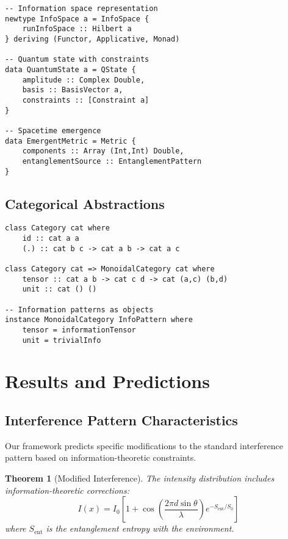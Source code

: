 \documentclass[12pt,a4paper]{article}
\newtheorem{theorem}{Theorem}[section]
\begin{document}
\begin{lstlisting}[style=haskell]
-- Information space representation
newtype InfoSpace a = InfoSpace { 
    runInfoSpace :: Hilbert a 
} deriving (Functor, Applicative, Monad)

-- Quantum state with constraints
data QuantumState a = QState {
    amplitude :: Complex Double,
    basis :: BasisVector a,
    constraints :: [Constraint a]
}

-- Spacetime emergence
data EmergentMetric = Metric {
    components :: Array (Int,Int) Double,
    entanglementSource :: EntanglementPattern
}
\end{lstlisting}

\subsection{Categorical Abstractions}

\begin{lstlisting}[style=haskell]
class Category cat where
    id :: cat a a
    (.) :: cat b c -> cat a b -> cat a c

class Category cat => MonoidalCategory cat where
    tensor :: cat a b -> cat c d -> cat (a,c) (b,d)
    unit :: cat () ()

-- Information patterns as objects
instance MonoidalCategory InfoPattern where
    tensor = informationTensor
    unit = trivialInfo
\end{lstlisting}

\section{Results and Predictions}

\subsection{Interference Pattern Characteristics}

Our framework predicts specific modifications to the standard interference pattern based on information-theoretic constraints.

\begin{theorem}[Modified Interference]
The intensity distribution includes information-theoretic corrections:
\begin{equation}
I(x) = I_0 \left[1 + \cos\left(\frac{2\pi d \sin\theta}{\lambda}\right) e^{-S_{\text{ent}}/S_0}\right]
\end{equation}
where $S_{\text{ent}}$ is the entanglement entropy with the environment.
\end{theorem}
\end{document}
